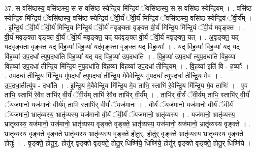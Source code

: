 \documentclass[17pt]{extarticle}
\begin{document}
37. स वसि॑ष्ठस्य॒ वसि॑ष्ठस्य॒ स स वसि॑ष्ठ स्येन्द्रि॒य मि॑न्द्रि॒यं ॅवसि॑ष्ठस्य॒ स स वसि॑ष्ठ
स्येन्द्रि॒यम् । . वसि॑ष्ठ स्येन्द्रि॒य मि॑न्द्रि॒यं ॅवसि॑ष्ठस्य॒ वसि॑ष्ठ स्येन्द्रि॒यं ॅवी॒र्यं॑ ॅवी॒र्य॑ मिन्द्रि॒यं ॅवसि॑ष्ठस्य॒ वसि॑ष्ठ स्येन्द्रि॒यं ॅवी॒र्य᳚म् । . इ॒न्द्रि॒यं ॅवी॒र्यं॑ ॅवी॒र्य॑ मिन्द्रि॒य मि॑न्द्रि॒यं ॅवी॒र्य॑ मवृङ्क्ता वृङ्क्त वी॒र्य॑ मिन्द्रि॒य मि॑न्द्रि॒यं ॅवी॒र्य॑ मवृङ्क्त । . वी॒र्य॑ मवृङ्क्ता वृङ्क्त वी॒र्यं॑ ॅवी॒र्य॑ मवृङ्क्त॒ यद् यद॑वृङ्क्त वी॒र्यं॑ ॅवी॒र्य॑ मवृङ्क्त॒ यत् । . अ॒वृ॒ङ्क्त॒ यद् यद॑वृङ्क्ता वृङ्क्त॒ यद् वि॑ह॒व्या॑ विह॒व्या॑ यद॑वृङ्क्ता वृङ्क्त॒ यद् वि॑ह॒व्याः᳚ । . यद् वि॑ह॒व्या॑ विह॒व्या॑ यद् यद् वि॑ह॒व्या॑ उप॒दधा᳚ त्युप॒दधा॑ति विह॒व्या॑ यद् यद् वि॑ह॒व्या॑ उप॒दधा॑ति । . वि॒ह॒व्या॑ उप॒दधा᳚ त्युप॒दधा॑ति विह॒व्या॑ विह॒व्या॑ उप॒दधा॑ तीन्द्रि॒य मि॑न्द्रि॒य मु॑प॒दधा॑ति विह॒व्या॑ विह॒व्या॑ उप॒दधा॑ तीन्द्रि॒यम् । . वि॒ह॒व्या॑ इति॑ वि - ह॒व्याः᳚ । . उ॒प॒दधा॑ तीन्द्रि॒य मि॑न्द्रि॒य मु॑प॒दधा᳚ त्युप॒दधा॑ तीन्द्रि॒य मे॒वैवेन्द्रि॒य मु॑प॒दधा᳚ त्युप॒दधा॑ तीन्द्रि॒य मे॒व । . उ॒प॒दधा॒तीत्यु॑प - दधा॑ति । . इ॒न्द्रि॒य मे॒वैवेन्द्रि॒य मि॑न्द्रि॒य मे॒व ताभि॒ स्ताभि॑ रे॒वेन्द्रि॒य मि॑न्द्रि॒य मे॒व ताभिः॑ । . ए॒व ताभि॒ स्ताभि॑ रे॒वैव ताभि॑र् वी॒र्यं॑ ॅवी॒र्य॑म् ताभि॑ रे॒वैव ताभि॑र् वी॒र्य᳚म् । . ताभि॑र् वी॒र्यं॑ ॅवी॒र्य॑म् ताभि॒ स्ताभि॑र् वी॒र्यं॑ ॅयज॑मानो॒ यज॑मानो वी॒र्य॑म् ताभि॒ स्ताभि॑र् वी॒र्यं॑ ॅयज॑मानः । . वी॒र्यं॑ ॅयज॑मानो॒ यज॑मानो वी॒र्यं॑ ॅवी॒र्यं॑ ॅयज॑मानो॒ भ्रातृ॑व्यस्य॒ भ्रातृ॑व्यस्य॒ यज॑मानो वी॒र्यं॑ ॅवी॒र्यं॑ ॅयज॑मानो॒ भ्रातृ॑व्यस्य । . यज॑मानो॒ भ्रातृ॑व्यस्य॒ भ्रातृ॑व्यस्य॒ यज॑मानो॒ यज॑मानो॒ भ्रातृ॑व्यस्य वृङ्क्ते वृङ्क्ते॒ भ्रातृ॑व्यस्य॒ यज॑मानो॒ यज॑मानो॒ भ्रातृ॑व्यस्य वृङ्क्ते । . भ्रातृ॑व्यस्य वृङ्क्ते वृङ्क्ते॒ भ्रातृ॑व्यस्य॒ भ्रातृ॑व्यस्य वृङ्क्ते॒ होतु॒र्॒. होतु॑र् वृङ्क्ते॒ भ्रातृ॑व्यस्य॒ भ्रातृ॑व्यस्य वृङ्क्ते॒ होतुः॑ । . वृ॒ङ्क्ते॒ होतु॒र्॒. होतु॑र् वृङ्क्ते वृङ्क्ते॒ होतु॒र् धिष्णि॑ये॒ धिष्णि॑ये॒ होतु॑र् वृङ्क्ते वृङ्क्ते॒ होतु॒र् धिष्णि॑ये । \newline
\end{document}

